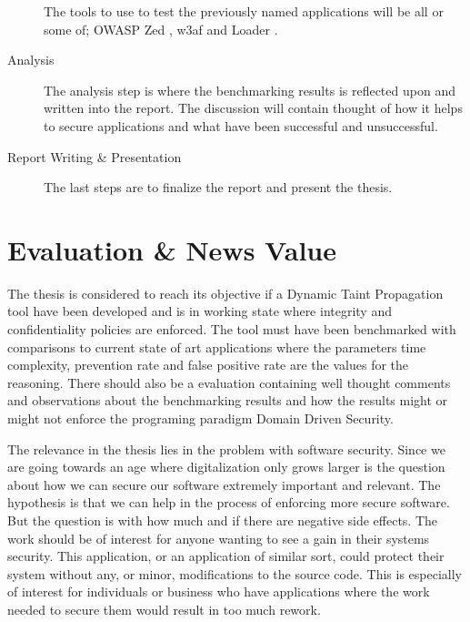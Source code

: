 \documentclass{../kththesis}
\begin{document}
\begin{description}
	The tools to use to test the previously named applications will be all or some of; OWASP Zed \parencite{zed}, w3af \parencite{w3af} and Loader \parencite{loader}.

	\item [Analysis]
	The analysis step is where the benchmarking results is reflected upon and written into the report. The discussion will contain thought of how it helps to secure applications and what have been successful and unsuccessful.

	\item [Report Writing \& Presentation]
	The last steps are to finalize the report and present the thesis.
\end{description}



\chapter{Evaluation \& News Value}
The thesis is considered to reach its objective if a Dynamic Taint Propagation tool have been developed and is in working state where integrity and confidentiality policies are enforced. The tool must have been benchmarked with comparisons to current state of art applications where the parameters time complexity, prevention rate and false positive rate are the values for the reasoning. There should also be a evaluation containing well thought comments and observations about the benchmarking results and how the results might or might not enforce the programing paradigm Domain Driven Security.

The relevance in the thesis lies in the problem with software security. Since we are going towards an age where digitalization only grows larger is the question about how we can secure our software extremely important and relevant. The hypothesis is that we can help in the process of enforcing more secure software. But the question is with how much and if there are negative side effects. The work should be of interest for anyone wanting to see a gain in their systems security. This application, or an application of similar sort, could protect their system without any, or minor, modifications to the source code. This is especially of interest for individuals or business who have applications where the work needed to secure them would result in too much rework.
\end{document}
